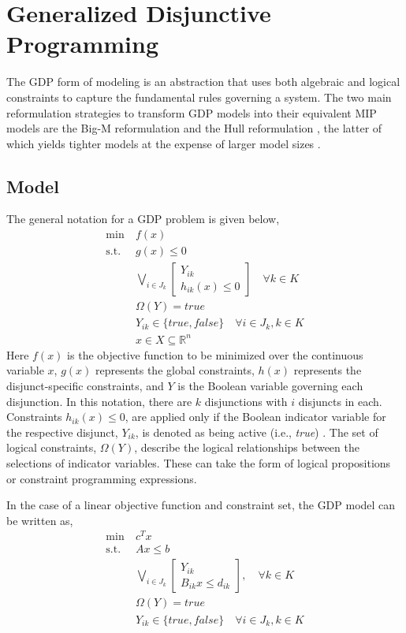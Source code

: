 \documentclass{juliacon}
\begin{document}
\section{Generalized Disjunctive Programming}
The GDP form of modeling is an abstraction that uses both algebraic and logical constraints to capture the fundamental rules governing a system. The two main reformulation strategies to transform GDP models into their equivalent MIP models are the Big-M reformulation \cite{nemhauser_1999, TRESPALACIOS201598} and the Hull reformulation \cite{LEE20002125}, the latter of which yields tighter models at the expense of larger model sizes \cite{grossmann_lee_2003}.

\subsection{Model}

The general notation for a GDP problem is given below,
\begin{align*}
    \min \ &f(x) \\
    \text{s.t.} \ &g(x) \leq 0 \\
    &\bigvee_{i \in J_k}
    \begin{bmatrix}
        Y_{ik} \\
        h_{ik}(x) \leq 0
    \end{bmatrix} \quad \forall k \in K \\
    & \Omega(Y) = true \\
    & Y_{ik} \in \{true, false\} \quad \forall i \in J_k, k \in K\\
    & x \in X \subseteq \mathbb{R}^n
\end{align*}
Here $f(x)$ is the objective function to be minimized over the continuous variable $x$, $g(x)$ represents the global constraints, $h(x)$ represents the disjunct-specific constraints, and $Y$ is the Boolean variable governing each disjunction. In this notation, there are $k$ disjunctions with $i$ disjuncts in each. Constraints $h_{ik}(x) \le 0$, are applied only if the Boolean indicator variable for the respective disjunct, $Y_{ik}$, is denoted as being active (i.e., \textit{true}) \cite{chen_grossmann_2019}. The set of logical constraints, $\Omega(Y)$, describe the logical relationships between the selections of indicator variables. These can take the form of logical propositions or constraint programming expressions.

In the case of a linear objective function and constraint set, the GDP model can be written as,
\begin{align*}
    \min \ & c^Tx \\
    \text{s.t.} \ &Ax \leq b \\
    &\bigvee_{i \in J_k}
    \begin{bmatrix}
        Y_{ik} \\
       B_{ik}x \leq d_{ik}
    \end{bmatrix}, \quad \forall k \in K \\
    & \Omega(Y) = true \\
    & Y_{ik} \in \{true, false\} \quad \forall i \in J_k, k \in K
\end{align*}
\end{document}
